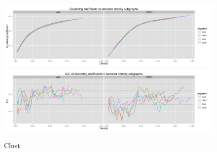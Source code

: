 \documentclass{frontiersSCNS} %
\begin{document}
\begin{figure}
\begin{center}
\includegraphics[width=\linewidth]{figures/clust_plot.png} \\
\includegraphics[width=\linewidth]{figures/clust_icc_plot.png}
\caption{Clust}
\label{fig:clust}
\end{center}
\end{figure}
\end{document}
